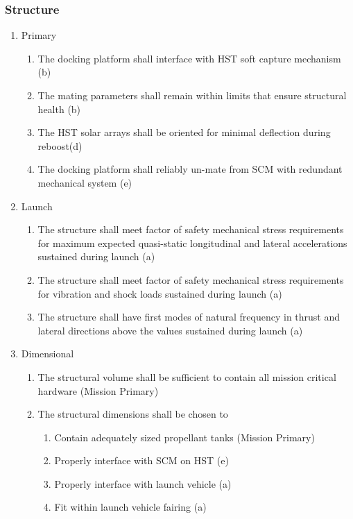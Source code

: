 \documentclass[paper=letter, fontsize=11pt]{scrartcl} %
\numberwithin{equation}{section} %
\numberwithin{figure}{section} %
\numberwithin{table}{section} %
\begin{document}
\subsubsection{Structure}
\begin{enumerate}
    \item Primary
          \begin{enumerate}
            \item The docking platform shall interface with HST soft capture mechanism (b)
            \item The mating parameters shall remain within limits that ensure structural health (b)
            \item The HST solar arrays shall be oriented for minimal deflection during reboost(d)
            \item The docking platform shall reliably un-mate from SCM with redundant mechanical system (e)
          \end{enumerate}
    \item Launch
          \begin{enumerate}
            \item The structure shall meet factor of safety mechanical stress requirements for maximum expected quasi-static longitudinal and lateral accelerations sustained during launch (a)
            \item The structure shall meet factor of safety mechanical stress requirements for vibration and shock loads sustained during launch (a)
            \item The structure shall have first modes of natural frequency in thrust and lateral directions above the values sustained during launch (a)
          \end{enumerate}
    \item Dimensional
          \begin{enumerate}
            \item The structural volume shall be sufficient to contain all mission critical hardware (Mission Primary)
            \item The structural dimensions shall be chosen to
                  \begin{enumerate}
                    \item Contain adequately sized propellant tanks (Mission Primary)
                    \item Properly interface with SCM on HST (e)
                    \item Properly interface with launch vehicle (a)
                    \item Fit within launch vehicle fairing (a)
                  \end{enumerate}
          \end{enumerate}
\end{enumerate}
\end{document}
